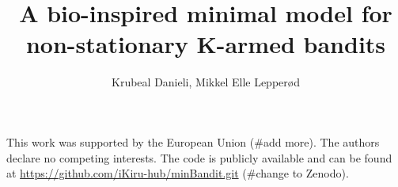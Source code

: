 \documentclass{article}
\begin{document}
\title{A bio-inspired minimal model for non-stationary K-armed bandits}
\author{Krubeal Danieli, Mikkel Elle Lepperød}

\maketitle

\newpage

\tableofcontents

\newpage










\newpage



\newpage

This work was supported by the European Union (\#add more).
\hfill \break
The authors declare no competing interests.
\hfill \break
The code is publicly available and can be found at
\url{https://github.com/iKiru-hub/minBandit.git} (\#change to Zenodo).



\newpage


\end{document}
